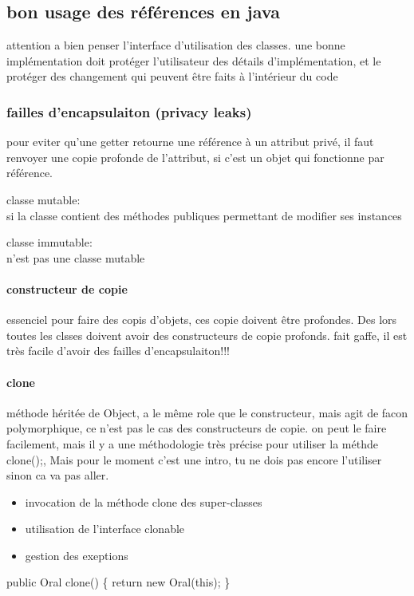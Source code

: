 \documentclass[a4paper,10pt]{article}
\begin{document}
\subsection{bon usage des références en java}
attention a bien penser l'interface d'utilisation des classes.
\newline
une bonne implémentation doit protéger l'utilisateur des détails d'implémentation, et le protéger des changement qui peuvent être faits à l'intérieur du code
\newline
\subsubsection{failles d'encapsulaiton (privacy leaks)}
pour eviter qu'une getter retourne une référence à un attribut privé, il faut renvoyer une copie profonde de l'attribut, si c'est un objet qui fonctionne par référence.
\begin{description}
 \item classe mutable:\\{si la classe contient des méthodes publiques permettant de modifier ses instances}
 \item classe immutable:\\{n'est pas une classe mutable}
\end{description}

\paragraph{constructeur de copie}
essenciel pour faire des copis d'objets, ces copie doivent être profondes. Des lors toutes les clsses doivent avoir des constructeurs de copie profonds.
\newline
fait gaffe, il est très facile d'avoir des failles d'encapsulaiton!!!
\paragraph{clone}
méthode héritée de Object, a le même role que le constructeur, mais agit de facon polymorphique, ce n'est pas le cas des constructeurs de copie.
\newline
on peut le faire facilement, mais il y a une méthodologie très précise pour utiliser la méthde clone();, Mais pour le moment c'est une intro, tu ne dois pas encore l'utiliser sinon ca va pas aller.
\begin{itemize}
 \item invocation de la méthode clone des super-classes
 \item utilisation de l'interface clonable
 \item gestion des exeptions
\end{itemize}
public Oral clone() \{
\newline
return new Oral(this);
\newline
\}
\end{document}
